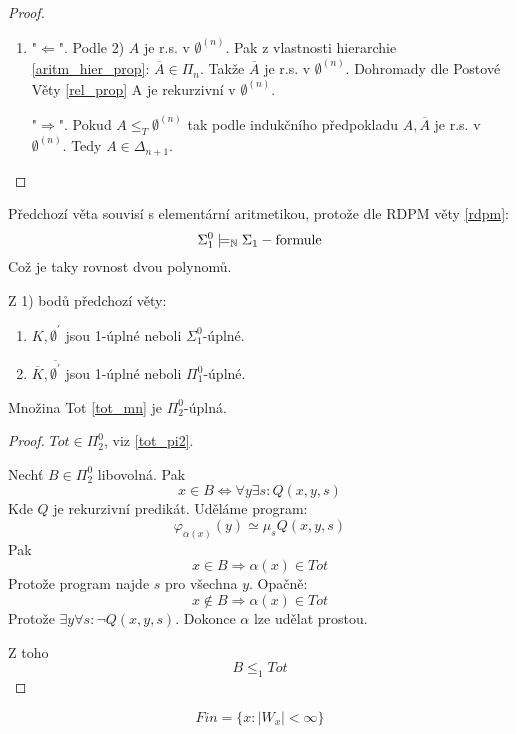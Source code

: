 \begin{proof}
\begin{enumerate}
		\item "$\Leftarrow$". Podle 2) $A$ je r.s. v $\emptyset^{(n)}$.
			Pak z vlastnosti hierarchie \cref{aritm_hier_prop}: $\overline{A} \in \Pi_n$.
			Takže $\overline{A}$ je r.s. v $\emptyset^{(n)}$.
			Dohromady dle Postové Věty \cref{rel_prop} A je rekurzivní v $\emptyset^{(n)}$.

			"$\Rightarrow$". Pokud $A \leq_T \emptyset^{(n)}$ tak podle indukčního předpokladu $A, \overline{A}$ je r.s. v $\emptyset^{(n)}$.
			Tedy $A \in \Delta_{n + 1}$.
	\end{enumerate}
\end{proof}

\begin{note}
	Předchozí věta souvisí s elementární aritmetikou, protože dle RDPM věty \cref{rdpm}:
	\[ \Sigma_1^0 \models_{\operatorname{\mathbb{N}}} \Sigma_1-\text{formule} \]
	Což je taky rovnost dvou polynomů.
\end{note}

Z 1) bodů předchozí věty:
\begin{consequence}[$K, \overline{K}$]
	\begin{enumerate}
		\item $K, \emptyset^{\prime}$ jsou 1-úplné neboli $\Sigma_1^0$-úplné.
		\item $\overline{K}, \overline{\emptyset^{\prime}}$ jsou 1-úplné neboli $\Pi_1^0$-úplné.
	\end{enumerate}
\end{consequence}

\begin{theorem}
	Množina Tot \cref{tot_mn} je $\Pi_2^0$-úplná.
\end{theorem}
\begin{proof}
	$Tot \in \Pi_2^0$, viz \cref{tot_pi2}.

	Nechť $B \in \Pi_2^0$ libovolná.
	Pak
	\[ x \in B \iff \forall y \exists s: Q(x, y, s) \]
	Kde $Q$ je rekurzivní predikát.
	Uděláme program:
	\[ \varphi_{\alpha(x)}(y) \simeq \mu_s Q(x, y, s) \]
	Pak
	\[ x \in B \Rightarrow \alpha(x) \in Tot \]
	Protože program najde $s$ pro všechna $y$.
	Opačně:
	\[ x \notin B \Rightarrow \alpha(x) \in Tot \]
	Protože $\exists y \forall s: \neg Q(x, y, s)$.
	Dokonce $\alpha$ lze udělat prostou.

	Z toho
	\[ B \leq_1 Tot \]
\end{proof}

\begin{definition}[Fin]
	\[ Fin = \{ x: |W_x| < \infty \} \]
\end{definition}

